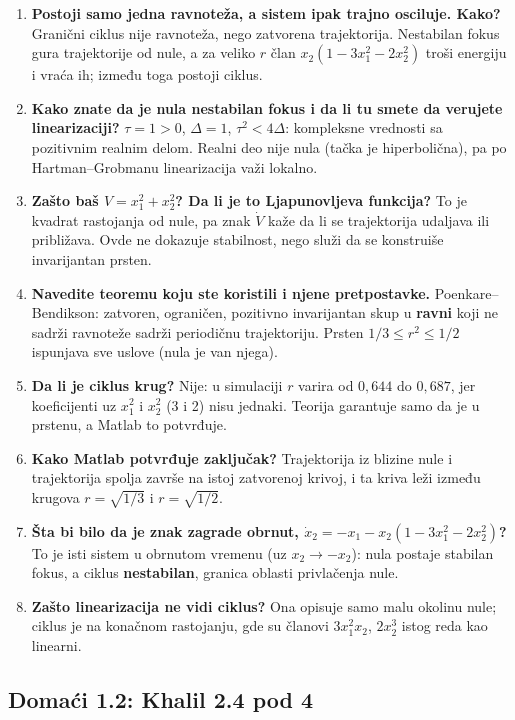 \documentclass[11pt,a4paper,parskip=half,headsepline,numbers=noenddot]{scrartcl}
\begin{document}
\begin{enumerate}
\def\labelenumi{\arabic{enumi}.}
\item \textbf{Postoji samo jedna ravnoteža, a sistem ipak trajno osciluje. Kako?} Granični ciklus nije ravnoteža, nego zatvorena trajektorija. Nestabilan fokus gura trajektorije od nule, a za veliko \(r\) član \(x_2(1 - 3x_1^2 - 2x_2^2)\) troši energiju i vraća ih; između toga postoji ciklus.
\item \textbf{Kako znate da je nula nestabilan fokus i da li tu smete da verujete linearizaciji?} \(\tau = 1 > 0\), \(\Delta = 1\), \(\tau^2 < 4\Delta\): kompleksne vrednosti sa pozitivnim realnim delom. Realni deo nije nula (tačka je hiperbolična), pa po Hartman--Grobmanu linearizacija važi lokalno.
\item \textbf{Zašto baš \(V = x_1^2 + x_2^2\)? Da li je to Ljapunovljeva funkcija?} To je kvadrat rastojanja od nule, pa znak \(\dot V\) kaže da li se trajektorija udaljava ili približava. Ovde ne dokazuje stabilnost, nego služi da se konstruiše invarijantan prsten.
\item \textbf{Navedite teoremu koju ste koristili i njene pretpostavke.} Poenkare--Bendikson: zatvoren, ograničen, pozitivno invarijantan skup u \textbf{ravni} koji ne sadrži ravnoteže sadrži periodičnu trajektoriju. Prsten \(1/3 \le r^2 \le 1/2\) ispunjava sve uslove (nula je van njega).
\item \textbf{Da li je ciklus krug?} Nije: u simulaciji \(r\) varira od \(0{,}644\) do \(0{,}687\), jer koeficijenti uz \(x_1^2\) i \(x_2^2\) (3 i 2) nisu jednaki. Teorija garantuje samo da je u prstenu, a Matlab to potvrđuje.
\item \textbf{Kako Matlab potvrđuje zaključak?} Trajektorija iz blizine nule i trajektorija spolja završe na istoj zatvorenoj krivoj, i ta kriva leži između krugova \(r = \sqrt{1/3}\) i \(r = \sqrt{1/2}\).
\item \textbf{Šta bi bilo da je znak zagrade obrnut, \(\dot x_2 = -x_1 - x_2(1 - 3x_1^2 - 2x_2^2)\)?} To je isti sistem u obrnutom vremenu (uz \(x_2 \to -x_2\)): nula postaje stabilan fokus, a ciklus \textbf{nestabilan}, granica oblasti privlačenja nule.
\item \textbf{Zašto linearizacija ne vidi ciklus?} Ona opisuje samo malu okolinu nule; ciklus je na konačnom rastojanju, gde su članovi \(3x_1^2x_2\), \(2x_2^3\) istog reda kao linearni.
\end{enumerate}

\subsection{Domaći 1.2: Khalil 2.4 pod 4}
\end{document}
